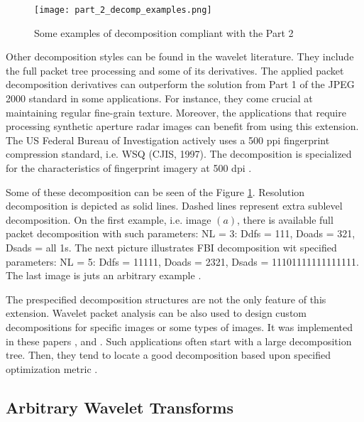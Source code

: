 \begin{figure}
    \centering
    \texttt{[image: part\_2\_decomp\_examples.png]}
    \caption{Some examples of decomposition compliant with the Part 2 \cite{jpeg_suite}}
    \label{fig:part_2_decomp_examples}
\end{figure}

Other decomposition styles can be found in the wavelet literature. They include the full packet
tree processing and some of its derivatives. The applied packet decomposition derivatives
can outperform the solution from Part 1 of the JPEG 2000 standard in some applications.
For instance, they come crucial at maintaining regular fine-grain texture. Moreover,
the applications that require processing synthetic aperture radar images can benefit
from using this extension. The US Federal Bureau of Investigation actively uses a 500 ppi
fingerprint compression standard, i.e. WSQ (CJIS, 1997). The decomposition is specialized
for the characteristics of fingerprint imagery at 500 dpi \cite{jpeg_suite}.

Some of these decomposition can be seen of the Figure \ref{fig:part_2_decomp_examples}.
Resolution decomposition is depicted as solid lines. Dashed lines represent extra sublevel
decomposition. On the first example, i.e. image $(a)$, there is available full packet decomposition
with such parameters: NL = 3: Ddfs = 111, Doads = 321, Dsads = all 1s. The next picture
illustrates FBI decomposition wit specified parameters: NL = 5: Ddfs = 11111, Doads = 2321,
Dsads = 11101111111111111. The last image is juts an arbitrary example \cite{jpeg_suite}.

The prespecified decomposition structures are not the only feature of this extension.
Wavelet packet analysis can be also used to design custom decompositions for specific images
or some types of images. It was implemented in these papers \cite{entropy_algos},
\cite{wavelet_packet} and \cite{adaptive_wavelet}. Such applications often start with
a large decomposition tree. Then, they tend to locate a good decomposition based upon
specified optimization metric \cite{jpeg_suite}.

\subsection{Arbitrary Wavelet Transforms}

